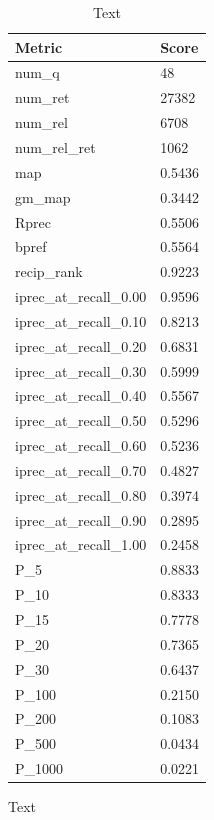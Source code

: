 \begin{table}[htb]
    \parbox{.45\linewidth}{
    \begin{tabular}{ | l | l | }
    \hline
    Metric & Score \\ \hline
	num\_q & 48 \\ \hline
	num\_ret & 27382 \\ \hline
	num\_rel & 6708 \\ \hline
	num\_rel\_ret & 1062 \\ \hline
	map & 0.5436 \\ \hline
	gm\_map & 0.3442 \\ \hline
	Rprec & 0.5506 \\ \hline
	bpref & 0.5564 \\ \hline
	recip\_rank & 0.9223 \\ \hline
	iprec\_at\_recall\_0.00 & 0.9596 \\ \hline
	iprec\_at\_recall\_0.10 & 0.8213 \\ \hline
	iprec\_at\_recall\_0.20 & 0.6831 \\ \hline
	iprec\_at\_recall\_0.30 & 0.5999 \\ \hline
	iprec\_at\_recall\_0.40 & 0.5567 \\ \hline
	iprec\_at\_recall\_0.50 & 0.5296 \\ \hline
	iprec\_at\_recall\_0.60 & 0.5236 \\ \hline
	iprec\_at\_recall\_0.70 & 0.4827 \\ \hline
	iprec\_at\_recall\_0.80 & 0.3974 \\ \hline
	iprec\_at\_recall\_0.90 & 0.2895 \\ \hline
	iprec\_at\_recall\_1.00 & 0.2458 \\ \hline
	P\_5 & 0.8833 \\ \hline
	P\_10 & 0.8333 \\ \hline
	P\_15 & 0.7778 \\ \hline
	P\_20 & 0.7365 \\ \hline
	P\_30 & 0.6437 \\ \hline
	P\_100 & 0.2150 \\ \hline
	P\_200 & 0.1083 \\ \hline
	P\_500 & 0.0434 \\ \hline
	P\_1000 & 0.0221 \\ \hline
    \end{tabular}
    \caption{Text}
    \label{table:manual-text}
    }
    \hfill
    \parbox{.45\linewidth}{
    \begin{tabular}{ | l | l | }
    \hline

\end{tabular}}
\end{table}
